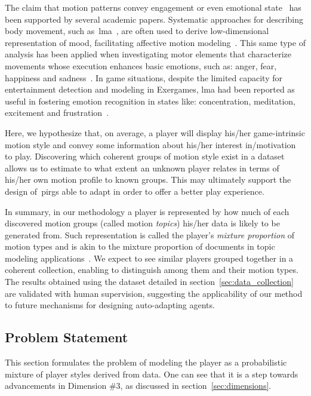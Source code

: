 The claim that motion patterns convey engagement or even emotional state~\citep{aristidou_emotion_2015,shafir_emotion_2016,tsachor_somatic_2017} has been supported by several academic papers. Systematic approaches for describing body movement, such as~\gls{lma}~\citep{laban_language_1974}, are often used to derive low-dimensional representation of mood, facilitating affective motion modeling~\citep{burton_laban_2016}. This same type of analysis has been applied when investigating motor elements that characterize movements whose execution enhances basic emotions, such as: anger, fear, happiness and sadness~\citep{shafir_emotion_2016}. In game situations, despite the limited capacity for entertainment detection and modeling in Exergames, \gls{lma} had been reported as useful in fostering emotion recognition in states like: concentration, meditation, excitement and frustration~\citep{zacharatos_emotion_2013}.

Here, we hypothesize that, on average, a player will display his/her game-intrinsic motion style and convey some information about his/her interest in/motivation to play. Discovering which coherent groups of motion style exist in a dataset allows us to estimate to what extent an unknown player relates in terms of his/her own motion profile to known groups. This may ultimately support the design of~\gls{pirg}s able to adapt in order to offer a better play experience.

In summary, in our methodology a player is represented by how much of each discovered motion groups (called motion \textit{topics}) his/her data is likely to be generated from. Such representation is called the player's \textit{mixture proportion} of motion types and is akin to the mixture proportion of documents in topic modeling applications~\citep{blei_latent_2003}. We expect to see similar players grouped together in a coherent collection, enabling to distinguish among them and their motion types. The results obtained using the dataset detailed in section~\ref{sec:data_collection} are validated with human supervision, suggesting the applicability of our method to future mechanisms for designing auto-adapting agents.

\subsection{Problem Statement}
This section formulates the problem of modeling the player as a probabilistic mixture of player styles derived from data.  One can see that it is a step towards advancements in Dimension \#3, as discussed in section~\ref{sec:dimensions}.


